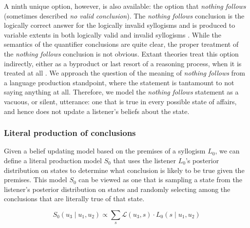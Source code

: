 \documentclass[floatsintext, doc]{apa6}
\begin{document}
A ninth unique option, however, is also available: the option that \emph{nothing follows} (sometimes described \emph{no valid conclusion}). 
The \emph{nothing follows} conclusion is the logically correct answer for the logically invalid syllogisms and is produced to variable extents in both logically valid and invalid syllogisms \cite{Khemlani2012}.
While the semantics of the quantifier conclusions are quite clear, the proper treatment of the \emph{nothing follows} conclusion is not obvious. 
Extant theories treat this option indirectly, either as a byproduct or last resort of a reasoning process, when it is treated at all \cite{ragni2019does, riesterer2020modeling}.
We approach the question of the meaning of \emph{nothing follows} from a language production standpoint, where the statement is tantamount to not saying anything at all. 
Therefore, we model the \emph{nothing follows} statement as a vacuous, or silent, utterance: one that is true in every possible state of affairs, and hence does not update a listener's beliefs about the state. 


\subsubsection{Literal production of conclusions}

Given a belief updating model based on the premises of a syllogism $L_0$, %
we can define a literal production model $S_0$ that uses the listener $L_0$'s posterior distribution on states to determine what conclusion is likely to be true given the premises. 
This model $S_0$ can be viewed as one that is sampling a state from the listener's posterior distribution on states and randomly selecting among the conclusions that are literally true of that state. 


\begin{equation}
S_0(u_3 \mid u_1, u_2) \propto \sum_s \mathcal{L}(u_3, s) \cdot L_0(s \mid u_1, u_2) \label{eq:R0}
\end{equation}
\end{document}
